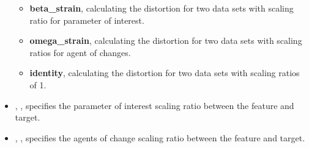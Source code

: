 \begin{itemize}
\begin{itemize}
        \item \textbf{beta\_strain}, calculating the distortion for two data sets with scaling ratio for parameter of interest.
        \item \textbf{omega\_strain}, calculating the distortion for two data sets with scaling ratios for agent of changes.
        \item \textbf{identity}, calculating the distortion for two data sets with scaling ratios of 1.
      \end{itemize}
    \item {}, , specifies the parameter of interest scaling ratio between the feature and target.
    \item {}, , specifies the agents of change scaling ratio between the feature and target.
\end{itemize}

